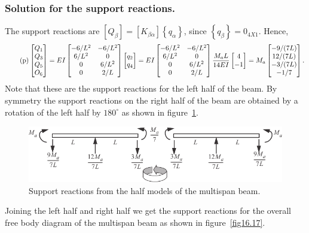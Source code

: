 \documentclass{AeroStructure-ERJohnson}
\begin{document}
\begin{example}
\subsubsection{Solution for the support reactions.} The support reactions are $\left[Q_{\beta}\right]=\left[K_{\beta \alpha}\right]\left\{q_{\alpha}\right\}$, since $\left\{q_{\beta}\right\}=0_{4 X 1}$. Hence,
\begin{align}\label{eq16.6p}\tag{p}
\left[\begin{array}{@{}l@{}}Q_{1} \\Q_{3} \\Q_{5} \\O_{6}\end{array}\right]=E I\left[\begin{array}{@{}cc@{}}-6 / L^{2} & -6 / L^{2} \\6 / L^{2} & 0 \\0 & 6 / L^{2} \\0 & 2 / L\end{array}\right]\left[\begin{array}{@{}l@{}}q_{2} \\q_{4}\end{array}\right]=E I\left[\begin{array}{@{}cc@{}}-6 / L^{2} & -6 / L^{2} \\6 / L^{2} & 0 \\0 & 6 / L^{2} \\0 & 2 / L\end{array}\right] \frac{M_{a} L}{14 E I}\left[\begin{array}{@{}c@{}}4 \\-1\end{array}\right]=M_{a}\left[\begin{array}{@{}c@{}}-9 /(7 L) \\12 /(7 L) \\-3 /(7 L) \\-1 / 7\end{array}\right].
\end{align}
Note that these are the support reactions for the left half of the beam. By symmetry the support reactions on the right half of the beam are obtained by a rotation of the left half by $180^{\circ}$ as shown in figure~\ref{fig16.16}.

\begin{figure}[!h]
\centerline{\includegraphics{Figure_16-16.pdf}}
\caption{Support reactions from the half models of the multispan beam.}\label{fig16.16}
\end{figure}

Joining the left half and right half we get the support reactions for the overall free body diagram of the multispan beam as shown in figure~\ref{fig16.17}.
\end{example}
\end{document}
